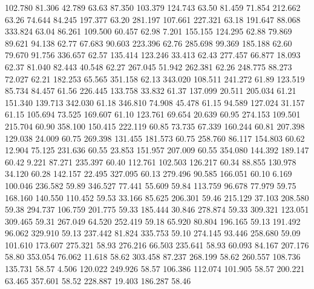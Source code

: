  102.780   81.306   42.789        63.63
  87.350  103.379  124.743        63.50
  81.459   71.854  212.662        63.26
  74.644   84.245  197.377        63.20
 281.197  107.661  227.321        63.18
 191.647   88.068  333.824        63.04
  86.261  109.500   60.457        62.98
   7.201  155.155  124.295        62.88
  79.869   89.621   94.138        62.77
  67.683   90.603  223.396        62.76
 285.698   99.369  185.188        62.60
  79.670   91.756  336.657        62.57
 135.414  123.246   33.413        62.43
 277.457   66.877   18.093        62.37
  81.040   82.443   40.548        62.27
 267.045   51.942  262.381        62.26
 248.775   88.273   72.027        62.21
 182.253   65.565  351.158        62.13
 343.020  108.511  241.272        61.89
 123.519   85.734   84.457        61.56
 226.445  133.758   33.832        61.37
 137.099   20.511  205.034        61.21
 151.340  139.713  342.030        61.18
 346.810   74.908   45.478        61.15
  94.589  127.024   31.157        61.15
 105.694   73.525  169.607        61.10
 123.761   69.654   20.639        60.95
 274.153  109.501  215.704        60.90
 358.100  150.415  222.119        60.85
  73.735   67.339  160.244        60.81
 207.398  129.038   24.009        60.75
 269.398  131.455  181.573        60.75
 258.760   86.117  154.803        60.62
  12.904   75.125  231.636        60.55
  23.853  151.957  207.009        60.55
 354.080  144.392  189.147        60.42
   9.221   87.271  235.397        60.40
 112.761  102.503  126.217        60.34
  88.855  130.978   34.120        60.28
 142.157   22.495  327.095        60.13
 279.496   90.585  166.051        60.10
   6.169  100.046  236.582        59.89
 346.527   77.441   55.609        59.84
 113.759   96.678   77.979        59.75
 168.160  140.550  110.452        59.53
  33.166   85.625  206.301        59.46
 215.129   37.103  208.580        59.38
 294.737  106.759  201.775        59.33
 185.444   30.846  278.874        59.33
 309.321  123.051  309.465        59.31
 267.049   64.520  252.419        59.18
  65.920   80.804  196.165        59.13
 191.492   96.062  329.910        59.13
 237.442   81.824  335.753        59.10
 274.145   93.446  258.680        59.09
 101.610  173.607  275.321        58.93
 276.216   66.503  235.641        58.93
  60.093   84.167  207.176        58.80
 353.054   76.062   11.618        58.62
 303.458   87.237  268.199        58.62
 260.557  108.736  135.731        58.57
   4.506  120.022  249.926        58.57
 106.386  112.074  101.905        58.57
 200.221   63.465  357.601        58.52
 228.887   19.403  186.287        58.46
